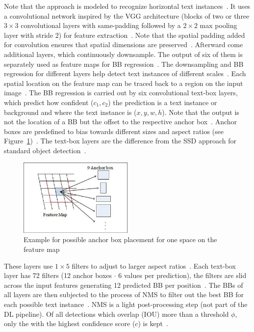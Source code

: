 Note that the approach is modeled to recognize horizontal text instances~\citep{liao_textboxes_2017}.
It uses a convolutional network inspired by the VGG architecture (blocks of two or
three $3\times3$ convolutional layers with same-padding followed by a $2\times2$ max pooling layer
with stride 2) for feature extraction~\citep{liao_textboxes_2017,simonyan_very_2015}.
Note that the spatial padding added for convolution ensures that spatial dimensions are
preserved~\citep{simonyan_very_2015}.
Afterward come additional layers, which continuously downsample.
The output of six of them is separately used as feature maps for \ac{BB}
regression~\citep{liao_textboxes_2017}.
The downsampling and \ac{BB} regression for different layers help detect text instances of different
scales~\citep{liu_ssd_2016}.
Each spatial location on the feature map can be traced back to a region on the input
image~\citep{long_scene_2021}.
The \ac{BB} regression is carried out by six convolutional text-box layers, which predict how
confident ($c_1,c_2$) the prediction is a text instance or background and where the text instance
is ($x,y,w,h$).
Note that the output is not the location of a \ac{BB} but the offset to the
respective anchor box~\citep{liao_textboxes_2017,long_scene_2021}.
Anchor boxes are predefined to bias towards different sizes and aspect ratios (see
Figure~\ref{fig:STD-segfree-anchors})~\citep{liao_textboxes_2017}.
The text-box layers are the difference from the \ac{SSD} approach for standard object
detection~\citep{liao_textboxes_2017,liu_ssd_2016}.
\begin{figure}[t]
    \centering
    \includegraphics[width=0.5\textwidth]{img/STD-seg-free-anchor-boxes-Zhao-Novel-2018.png}
    \caption[Anchor box placement for one space on the feature map]{%
        Example for possible anchor box placement for one space on the feature
        map~\citep{zhao_novel_2018}\label{fig:STD-segfree-anchors}
    }
\end{figure}
These layers use $1\times5$ filters to adjust to larger aspect ratios~\citep{liao_textboxes_2017}.
Each text-box layer has 72 filters (12 anchor boxes $\cdot$ 6 values per prediction), the filters
are slid across the input features generating 12 predicted \ac{BB} per
position~\citep{liao_textboxes_2017}.
The \acp{BB} of all layers are then subjected to the process of \ac{NMS} to filter out the best
\ac{BB} for each possible text instance~\citep{liao_textboxes_2017}.
\ac{NMS} is a light post-processing step (not part of the \ac{DL} pipeline).
Of all detections which overlap (\ac{IOU}) more than a threshold
$\phi$, only the with the highest confidence score ($c$) is kept~\citep{hosang_learning_2017}.

